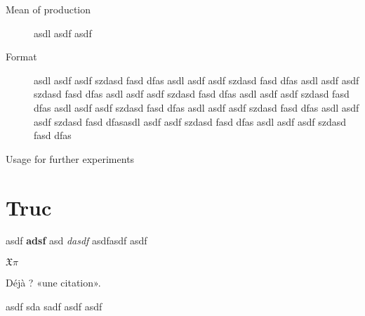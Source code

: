 \documentclass[12pt]{amsbook}
\begin{document}
\begin{description}
\item[Mean of production] asdl asdf asdf 
\item[Format] asdl asdf asdf szdasd fasd dfas asdl asdf asdf szdasd
  fasd dfas asdl asdf asdf szdasd fasd dfas asdl asdf asdf szdasd fasd
  dfas asdl asdf asdf szdasd fasd dfas asdl asdf asdf szdasd fasd dfas
  asdl asdf asdf szdasd fasd dfas asdl asdf asdf szdasd fasd dfasasdl
  asdf asdf szdasd fasd dfas asdl asdf asdf szdasd fasd dfas
\item[Usage for further experiments] 
\end{description}

\section{Truc}

asdf \textbf{adsf} asd \textit{dasdf} asdfasdf asdf

\Huge

$\mathfrak{X\pi}$

Déjà ? «une citation».

asdf
sda
sadf
asdf
asdf
\end{document}
